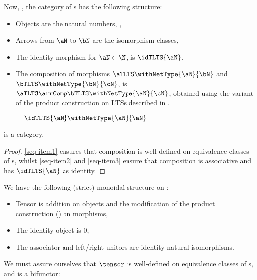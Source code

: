 Now, \TLTSCat{}, the category of \TLTS{}s has the following structure:
\begin{itemize}
\item Objects are the natural numbers, \N,
\item Arrows from $\aN$ to $\bN$ are the \LTSB{\aN}{\bN} isomorphism classes,
\item The identity morphism for $\aN \in \N$, is $\idTLTS{\aN}$,
\item The composition of morphisms $\aTLTS \withNetType{\aN}{\bN}$ and $\bTLTS
    \withNetType{\bN}{\cN}$, is $\aTLTS \arrComp \bTLTS
    \withNetType{\aN}{\cN}$, obtained using the variant of the product
    construction on LTSs described in .
\end{itemize}

\begin{figure}[ht]
    \centering
\caption{\TLTS{} $\idTLTS{\aN} \withNetType{\aN}{\aN}$}
\label{fig:idTLTS}
\end{figure}

\begin{proposition}\TLTSCat{} is a category.
    \label{prop:TLTSCategory}
\end{proposition}
\begin{proof}
    \ref{seq-item1} ensures that \TLTS{}
    composition is well-defined on equivalence classes of \TLTS{}s, whilst
    \ref{seq-item2} and \ref{seq-item3} ensure that composition is associative
    and has $\idTLTS{\aN}$ as identity.
\end{proof}

We have the following (strict) monoidal structure on \TLTSCat{}:
\begin{itemize}
    \item Tensor is addition on objects and the modification of the product
        construction () on morphisms,
    \item The identity object is $0$,
    \item The associator and left/right unitors are identity natural
        isomorphisms.
\end{itemize}

We must assure ourselves that $\tensor$ is well-defined on equivalence
classes of \TLTS{}s, and is a bifunctor:

